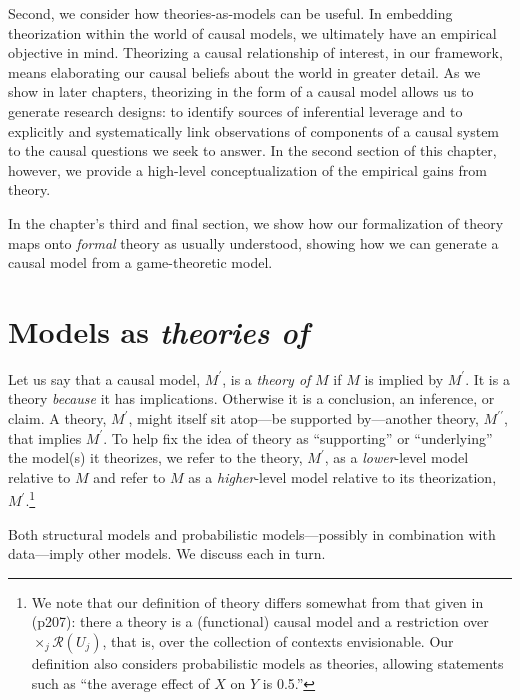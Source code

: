 \documentclass[
  12pt,
]{book}
\begin{document}
Second, we consider how theories-as-models can be useful. In embedding theorization within the world of causal models, we ultimately have an empirical objective in mind. Theorizing a causal relationship of interest, in our framework, means elaborating our causal beliefs about the world in greater detail. As we show in later chapters, theorizing in the form of a causal model allows us to generate research designs: to identify sources of inferential leverage and to explicitly and systematically link observations of components of a causal system to the causal questions we seek to answer. In the second section of this chapter, however, we provide a high-level conceptualization of the empirical gains from theory.

In the chapter's third and final section, we show how our formalization of theory maps onto \emph{formal} theory as usually understood, showing how we can generate a causal model from a game-theoretic model.

\hypertarget{models-as-theories-of}{%
\section{\texorpdfstring{Models as \emph{theories of}}{Models as theories of}}\label{models-as-theories-of}}

Let us say that a causal model, \(M^\prime\), is a \emph{theory of} \(M\) if \(M\) is implied by \(M^\prime\). It is a theory \emph{because} it has implications. Otherwise it is a conclusion, an inference, or claim. A theory, \(M^\prime\), might itself sit atop---be supported by---another theory, \(M^{\prime\prime}\), that implies \(M^\prime\). To help fix the idea of theory as ``supporting'' or ``underlying'' the model(s) it theorizes, we refer to the theory, \(M^\prime\), as a \emph{lower}-level model relative to \(M\) and refer to \(M\) as a \emph{higher}-level model relative to its theorization, \(M^\prime\).\footnote{We note that our definition of theory differs somewhat from that given in \citet{pearl2009causality} (p207): there a theory is a (functional) causal model and a restriction over \(\times_j \mathcal{R}(U_j)\), that is, over the collection of contexts envisionable. Our definition also considers probabilistic models as theories, allowing statements such as ``the average effect of \(X\) on \(Y\) is 0.5.''}

Both structural models and probabilistic models---possibly in combination with data---imply other models. We discuss each in turn.
\end{document}
